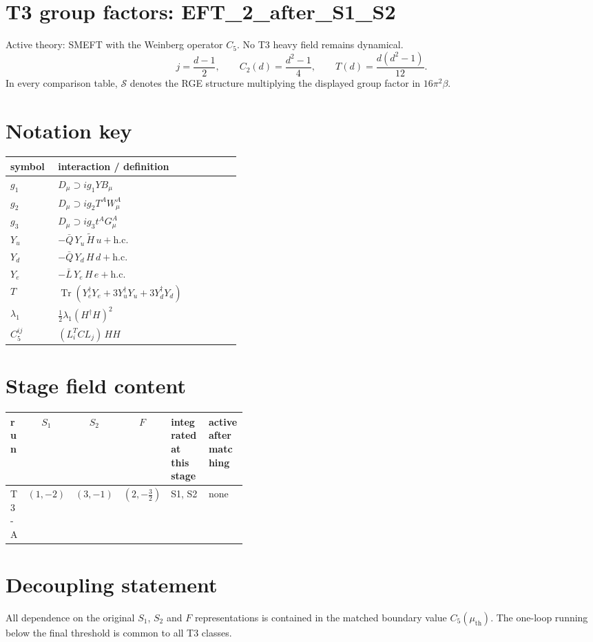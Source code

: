 \documentclass[9pt]{article}
\begin{document}
\section*{T3 group factors: EFT\_2\_after\_S1\_S2}
Active theory: SMEFT with the Weinberg operator $C_5$.  No T3 heavy field remains dynamical.
\[j=\frac{d-1}{2},\qquad C_2(d)=\frac{d^2-1}{4},\qquad T(d)=\frac{d(d^2-1)}{12}.\]
In every comparison table, $\mathcal{S}$ denotes the RGE structure multiplying the displayed group factor in $16\pi^2\beta$.
\section*{Notation key}
\begin{longtable}{@{}p{0.19\linewidth}p{0.73\linewidth}@{}}
\toprule
symbol & interaction / definition \\
\midrule
$g_1$ & $D_\mu\supset i g_1 Y B_\mu$ \\
$g_2$ & $D_\mu\supset i g_2 T^A W_\mu^A$ \\
$g_3$ & $D_\mu\supset i g_3 t^A G_\mu^A$ \\
$Y_u$ & $-\bar Q\,Y_u\,\widetilde H\,u+\mathrm{h.c.}$ \\
$Y_d$ & $-\bar Q\,Y_d\,H\,d+\mathrm{h.c.}$ \\
$Y_e$ & $-\bar L\,Y_e\,H\,e+\mathrm{h.c.}$ \\
$T$ & $\operatorname{Tr}\!\left(Y_e^\dagger Y_e+3Y_u^\dagger Y_u+3Y_d^\dagger Y_d\right)$ \\
$\lambda_1$ & $\frac12\lambda_1(H^\dagger H)^2$ \\
$C_5^{ij}$ & $(L_i^T C L_j)\,H H$ \\
\bottomrule
\end{longtable}
\section*{Stage field content}
\begin{longtable}{@{}lccc p{0.20\linewidth}p{0.20\linewidth}@{}}
\toprule
run & $S_1$ & $S_2$ & $F$ & integrated at this stage & active after matching \\
\midrule
T3-A & $(1,-2)$ & $(3,-1)$ & $(2,- \frac{3}{2})$ & S1, S2 & none \\
\bottomrule
\end{longtable}
\section*{Decoupling statement}
All dependence on the original $S_1$, $S_2$ and $F$ representations is contained in the matched boundary value $C_5(\mu_{\mathrm{th}})$.  The one-loop running below the final threshold is common to all T3 classes.
\end{document}
